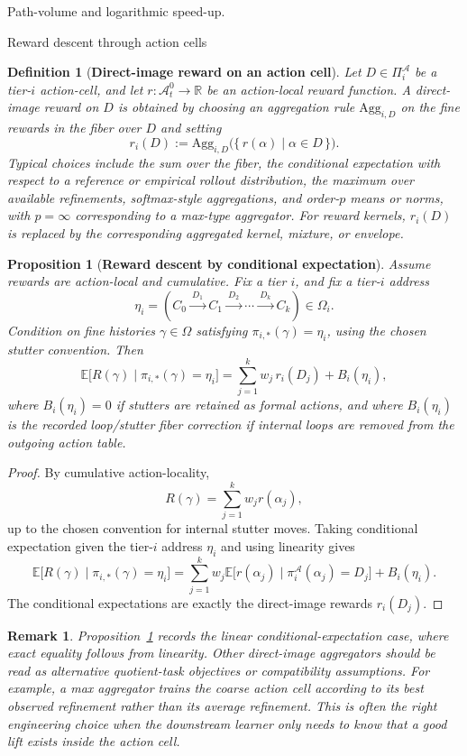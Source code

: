 \documentclass[11pt]{article}
\newtheorem{definition}[subsubsection]{Definition}
\newtheorem{remark}[subsubsection]{Remark}
\newtheorem{proposition}[subsubsection]{Proposition}
\newcommand{\E}{\mathbb{E}}
\newcommand{\R}{\mathbb{R}}
\begin{document}
\begin{section}{Path-volume and logarithmic speed-up.}
\begin{subsection}{Reward descent through action cells}
\begin{definition}[{\bf Direct-image reward on an action cell}]\label{def:direct-image-action-cell-reward}
\normalfont
Let $D\in\Pi_i^{\mathcal A}$ be a tier-$i$ action-cell, and let $r:\mathcal{A}_t^0\to\R$ be an action-local reward function. A direct-image reward on $D$ is obtained by choosing an aggregation rule $\mathrm{Agg}_{i,D}$ on the fine rewards in the fiber over $D$ and setting
$$
r_i(D)
:=
\mathrm{Agg}_{i,D}\bigl(\{\,r(\alpha)\mid \alpha\in D\,\}\bigr).
$$
Typical choices include the sum over the fiber, the conditional expectation with respect to a reference or empirical rollout distribution, the maximum over available refinements, softmax-style aggregations, and order-$p$ means or norms, with $p=\infty$ corresponding to a max-type aggregator. For reward kernels, $r_i(D)$ is replaced by the corresponding aggregated kernel, mixture, or envelope.
\end{definition}

\begin{proposition}[{\bf Reward descent by conditional expectation}]\label{prop:reward-descent-partition}
Assume rewards are action-local and cumulative. Fix a tier $i$, and fix a tier-$i$ address
$$
\eta_i
=
\left(
C_0\xrightarrow{\ D_1\ }C_1
\xrightarrow{\ D_2\ }\cdots
\xrightarrow{\ D_k\ }C_k
\right)
\in\Omega_i.
$$
Condition on fine histories $\gamma\in\Omega$ satisfying $\pi_{i,*}(\gamma)=\eta_i$, using the chosen stutter convention. Then
$$
\E\bigl[R(\gamma)\mid \pi_{i,*}(\gamma)=\eta_i\bigr]
=
\sum_{j=1}^{k}w_j\,r_i(D_j)
+B_i(\eta_i),
$$
where $B_i(\eta_i)=0$ if stutters are retained as formal actions, and where $B_i(\eta_i)$ is the recorded loop/stutter fiber correction if internal loops are removed from the outgoing action table.
\end{proposition}

\begin{proof}
By cumulative action-locality,
$$
R(\gamma)=\sum_{j=1}^{k}w_jr(\alpha_j),
$$
up to the chosen convention for internal stutter moves. Taking conditional expectation given the tier-$i$ address $\eta_i$ and using linearity gives
$$
\E\bigl[R(\gamma)\mid \pi_{i,*}(\gamma)=\eta_i\bigr]
=
\sum_{j=1}^{k}w_j
\E\bigl[r(\alpha_j)\mid \pi_i^{\mathcal A}(\alpha_j)=D_j\bigr]
+B_i(\eta_i).
$$
The conditional expectations are exactly the direct-image rewards $r_i(D_j)$.
\end{proof}

\begin{remark}
\normalfont
Proposition~\ref{prop:reward-descent-partition} records the linear conditional-expectation case, where exact equality follows from linearity. Other direct-image aggregators should be read as alternative quotient-task objectives or compatibility assumptions. For example, a max aggregator trains the coarse action cell according to its best observed refinement rather than its average refinement. This is often the right engineering choice when the downstream learner only needs to know that a good lift exists inside the action cell.


\end{remark}
\end{subsection}
\end{section}
\end{document}
